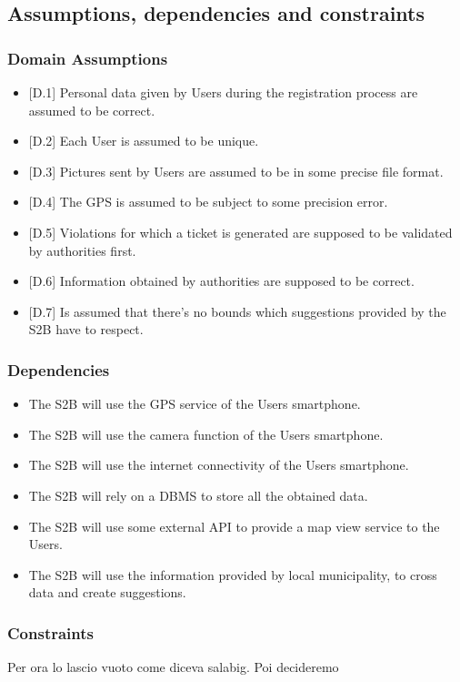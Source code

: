 \subsection{Assumptions,
dependencies
and
constraints}


\subsubsection{Domain Assumptions}
\begin{itemize}
    \item {[D.1]} Personal data given by Users during the registration process are assumed to be correct.
    \item {[D.2]} Each User is assumed to be unique.
    \item {[D.3]} Pictures sent by Users are assumed to be in some precise file format.
    \item {[D.4]} The GPS is assumed to be subject to some precision error.
    \item {[D.5]} Violations for which a ticket is generated are supposed to be validated by authorities first.
    \item {[D.6]} Information obtained by authorities are supposed to be correct.
    \item {[D.7]} Is assumed that there's no bounds which suggestions provided by the S2B have to respect.\\
\end{itemize}

\subsubsection{Dependencies}
\begin{itemize}
    \item The S2B will use the GPS service of the Users smartphone.
    \item The S2B will use the camera function of the Users smartphone.
    \item The S2B will use the internet connectivity of the Users smartphone.
    \item The S2B will rely on a DBMS to store all the obtained data.
    \item The S2B will use some external API to provide  a map view service to the Users.
    \item The S2B will use the information provided by local municipality, to cross data and create suggestions.\\
\end{itemize}


\subsubsection{Constraints}
Per ora lo lascio vuoto come diceva salabig. Poi decideremo\\




